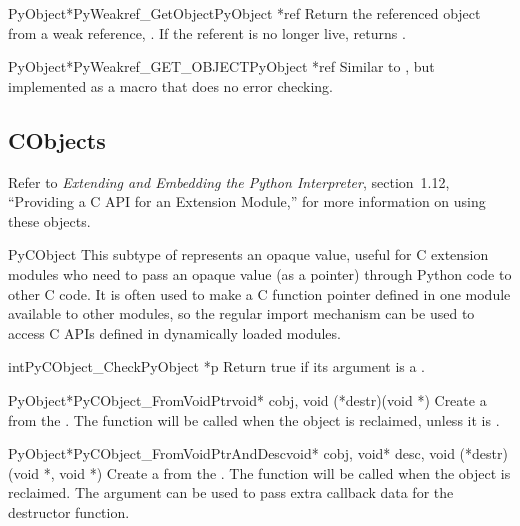 \begin{cfuncdesc}{PyObject*}{PyWeakref_GetObject}{PyObject *ref}
  Return the referenced object from a weak reference, .  If
  the referent is no longer live, returns .
\end{cfuncdesc}

\begin{cfuncdesc}{PyObject*}{PyWeakref_GET_OBJECT}{PyObject *ref}
  Similar to , but implemented as a
  macro that does no error checking.
\end{cfuncdesc}


\subsection{CObjects \label{cObjects}}

Refer to \emph{Extending and Embedding the Python Interpreter},
section~1.12, ``Providing a C API for an Extension Module,'' for more
information on using these objects.


\begin{ctypedesc}{PyCObject}
  This subtype of  represents an opaque value, useful
  for C extension modules who need to pass an opaque value (as a
   pointer) through Python code to other C code.  It is
  often used to make a C function pointer defined in one module
  available to other modules, so the regular import mechanism can be
  used to access C APIs defined in dynamically loaded modules.
\end{ctypedesc}

\begin{cfuncdesc}{int}{PyCObject_Check}{PyObject *p}
  Return true if its argument is a .
\end{cfuncdesc}

\begin{cfuncdesc}{PyObject*}{PyCObject_FromVoidPtr}{void* cobj,
                                                    void (*destr)(void *)}
  Create a  from the .  The
   function will be called when the object is reclaimed,
  unless it is \NULL{}.
\end{cfuncdesc}

\begin{cfuncdesc}{PyObject*}{PyCObject_FromVoidPtrAndDesc}{void* cobj,
	                          void* desc, void (*destr)(void *, void *)}
  Create a  from the .  The
   function will be called when the object is reclaimed.
  The  argument can be used to pass extra callback data for
  the destructor function.
\end{cfuncdesc}

